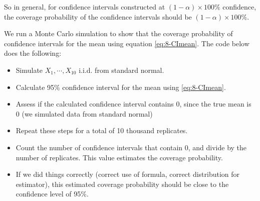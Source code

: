 \documentclass[
]{book}
\providecommand{\tightlist}{%
  \setlength{\itemsep}{0pt}\setlength{\parskip}{0pt}}
\begin{document}
So in general, for confidence intervals constructed at \((1-\alpha) \times 100\%\) confidence, the coverage probability of the confidence intervals should be \((1-\alpha) \times 100\%\).

We run a Monte Carlo simulation to show that the coverage probability of confidence intervals for the mean using equation \eqref{eq:8-CImean}. The code below does the following:

\begin{itemize}
\tightlist
\item
  Simulate \(X_1, \cdots, X_{10}\) i.i.d. from standard normal.
\item
  Calculate 95\% confidence interval for the mean using \eqref{eq:8-CImean}.
\item
  Assess if the calculated confidence interval contains 0, since the true mean is 0 (we simulated data from standard normal)
\item
  Repeat these steps for a total of 10 thousand replicates.
\item
  Count the number of confidence intervals that contain 0, and divide by the number of replicates. This value estimates the coverage probability.
\item
  If we did things correctly (correct use of formula, correct distribution for estimator), this estimated coverage probability should be close to the confidence level of 95\%.
\end{itemize}
\end{document}
